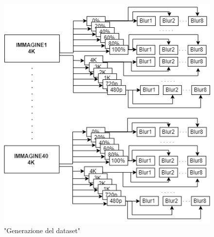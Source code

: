 \documentclass[a4paper,11pt]{article}
\begin{document}
    \newpage
    \begin{figure}[h]
        \centering
        \includegraphics[scale=0.8]{generazione.png}
        \caption{"Generazione del dataset"}
    \end{figure}
    \newpage
\end{document}
